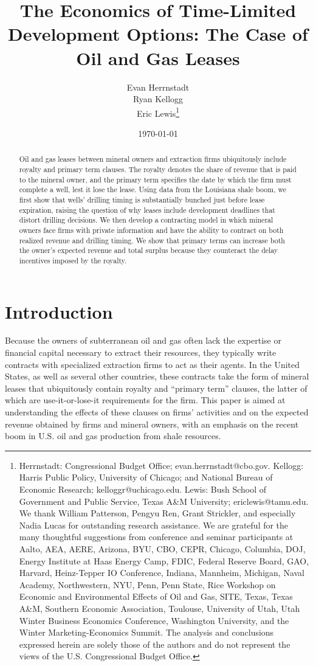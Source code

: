 \documentclass[12pt]{article}
\title{{\large \textbf{The Economics of Time-Limited Development Options: The Case of Oil and Gas Leases}}}
\author{Evan Herrnstadt \\ Ryan Kellogg \\  Eric Lewis\thanks{Herrnstadt: Congressional Budget Office; evan.herrnstadt@cbo.gov. Kellogg: Harris Public Policy, University of Chicago; and National Bureau of Economic Research; kelloggr@uchicago.edu. Lewis: Bush School of Government and Public Service, Texas A\&M University; ericlewis@tamu.edu. We thank William Patterson, Pengyu Ren, Grant Strickler, and especially Nadia Lucas for outstanding research assistance. We are grateful for the many thoughtful suggestions from conference and seminar participants at Aalto, AEA, AERE, Arizona, BYU, CBO, CEPR, Chicago, Columbia, DOJ, Energy Institute at Haas Energy Camp, FDIC, Federal Reserve Board, GAO, Harvard, Heinz-Tepper IO Conference, Indiana, Mannheim, Michigan, Naval Academy, Northwestern, NYU, Penn, Penn State, Rice Workshop on Economic and Environmental Effects of Oil and Gas, SITE, Texas, Texas A\&M, Southern Economic Association, Toulouse, University of Utah, Utah Winter Business Economics Conference, Washington University, and the Winter Marketing-Economics Summit. The analysis and conclusions expressed herein are solely those of the authors and do not represent the views of the U.S. Congressional Budget Office.}}
\date{\vspace{3ex}  \today \\  }
\begin{document}

\maketitle

\thispagestyle{empty}	


\begin{abstract}
Oil and gas leases between mineral owners and extraction firms ubiquitously include royalty and primary term clauses. The royalty denotes the share of revenue that is paid to the mineral owner, and the primary term specifies the date by which the firm must complete a well, lest it lose the lease. Using data from the Louisiana shale boom, we first show that wells' drilling timing is substantially bunched just before lease expiration, raising the question of why leases include development deadlines that distort drilling decisions. We then develop a contracting model in which mineral owners face firms with private information and have the ability to contract on both realized revenue and drilling timing. We show that primary terms can increase both the owner's expected revenue and total surplus because they counteract the delay incentives imposed by the royalty.
\end{abstract}


\newpage


{}

\section{Introduction \label{sec:Intro}}

Because the owners of subterranean oil and gas often lack the expertise or financial capital necessary to extract their resources, they typically write contracts with specialized extraction firms to act as their agents. In the United States, as well as several other countries, these contracts take the form of mineral leases that ubiquitously contain royalty and ``primary term'' clauses, the latter of which are use-it-or-lose-it requirements for the firm. This paper is aimed at understanding the effects of these clauses on firms' activities and on the expected revenue obtained by firms and mineral owners, with an emphasis on the recent boom in U.S. oil and gas production from shale resources. 
\end{document}
